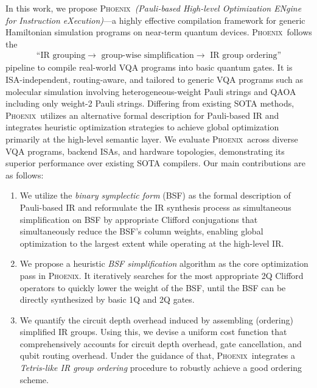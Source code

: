 \documentclass[conference,9pt]{IEEEtran}
\newcommand{\dquote}[1]{``#1''}
\newcommand{\phoenix}{\textsc{Phoenix}}
\begin{document}
    In this work, we propose \phoenix\ \emph{(Pauli-based High-level Optimization ENgine for Instruction eXecution)}---a highly effective compilation framework for generic Hamiltonian simulation programs on near-term quantum devices. \phoenix\ follows the 
    \begin{align*}
        \text{\dquote{IR grouping$\to$ group-wise simplification$\to$ IR group ordering}}
    \end{align*}
    pipeline to compile real-world VQA programs into basic quantum gates. It is ISA-independent, routing-aware, and tailored to generic VQA programs such as molecular simulation involving heterogeneous-weight Pauli strings and QAOA including only weight-2 Pauli strings. Differing from existing SOTA methods, \phoenix\ utilizes an alternative formal description for Pauli-based IR and integrates heuristic optimization strategies to achieve global optimization primarily at the high-level semantic layer. We evaluate \phoenix\ across diverse VQA programs, backend ISAs, and hardware topologies, demonstrating its superior performance over existing SOTA compilers. Our main contributions are as follows:
    \begin{enumerate}
        \item We utilize the \emph{binary symplectic form} (BSF) as the formal description of Pauli-based IR and reformulate the IR synthesis process as simultaneous simplification on BSF by appropriate Clifford conjugations that simultaneously reduce the BSF's column weights, enabling global optimization to the largest extent while operating at the high-level IR.
        \item We propose a heuristic \textit{BSF simplification} algorithm as the core optimization pass in \phoenix. It iteratively searches for the most appropriate 2Q Clifford operators to quickly lower the weight of the BSF, until the BSF can be directly synthesized by basic 1Q and 2Q gates.
        \item We quantify the circuit depth overhead induced by assembling (ordering) simplified IR groups. Using this, we devise a uniform cost function that comprehensively accounts for circuit depth overhead, gate cancellation, and qubit routing overhead. Under the guidance of that, \phoenix\ integrates a \emph{Tetris-like IR group ordering} procedure to robustly achieve a good ordering scheme.
    \end{enumerate}
\end{document}
